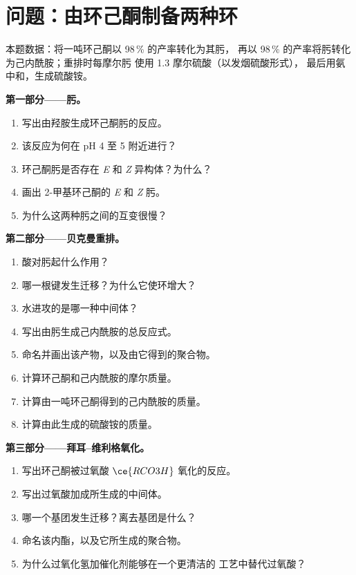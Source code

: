 \section{问题：由环己酮制备两种环}

\begin{problem}
\label{pb:b3:radicals-carbenes:1}
本题数据：将一吨环己酮以 98\,\% 的产率转化为其肟，
再以 98\,\% 的产率将肟转化为己内酰胺；重排时每摩尔肟
使用 1.3 摩尔硫酸（以发烟硫酸形式），
最后用氨中和，生成硫酸铵。

\medskip\noindent\textbf{第一部分——肟。}
\begin{enumerate}
  \item 写出由羟胺生成环己酮肟的反应。
  \item 该反应为何在 pH 4 至 5 附近进行？
  \item 环己酮肟是否存在 \textit{E} 和 \textit{Z} 异构体？为什么？
  \item 画出 2-甲基环己酮的 \textit{E} 和 \textit{Z} 肟。
  \item 为什么这两种肟之间的互变很慢？
\end{enumerate}

\medskip\noindent\textbf{第二部分——贝克曼重排。}
\begin{enumerate}[resume]
  \item 酸对肟起什么作用？
  \item 哪一根键发生迁移？为什么它使环增大？
  \item 水进攻的是哪一种中间体？
  \item 写出由肟生成己内酰胺的总反应式。
  \item 命名并画出该产物，以及由它得到的聚合物。
  \item 计算环己酮和己内酰胺的摩尔质量。
  \item 计算由一吨环己酮得到的己内酰胺的质量。
  \item 计算由此生成的硫酸铵的质量。
\end{enumerate}

\medskip\noindent\textbf{第三部分——拜耳–维利格氧化。}
\begin{enumerate}[resume]
  \item 写出环己酮被过氧酸 $\ce{RCO3H}$ 氧化的反应。
  \item 写出过氧酸加成所生成的中间体。
  \item 哪一个基团发生迁移？离去基团是什么？
  \item 命名该内酯，以及它所生成的聚合物。
  \item 为什么过氧化氢加催化剂能够在一个更清洁的
        工艺中替代过氧酸？
\end{enumerate}


\end{problem}
